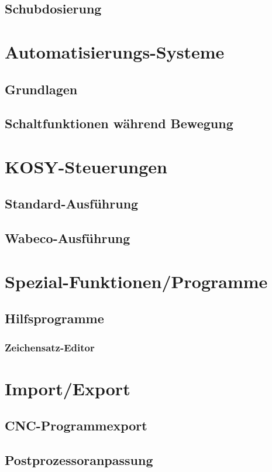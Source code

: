 \documentclass[a4paper]{book}
\begin{document}
	\section{Schubdosierung} 
 
\chapter{Automatisierungs-Systeme}
	\section{Grundlagen} 
	\section{Schaltfunktionen während Bewegung} 
 
\chapter{KOSY-Steuerungen} 
	\section{Standard-Ausführung} 
	\section{Wabeco-Ausführung} 

\chapter{Spezial-Funktionen/Programme} 
	\section{Hilfsprogramme} 
		\subsection{Zeichensatz-Editor} 

\chapter{Import/Export} 
	\section{CNC-Programmexport} 
	\section{Postprozessoranpassung} 
\end{document}
